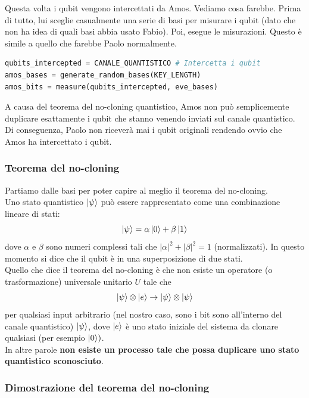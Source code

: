 \documentclass[a4paper]{article}
\begin{document}
Questa volta i qubit vengono intercettati da Amos. 
Vediamo cosa farebbe. Prima di tutto, lui sceglie casualmente una serie di basi
per misurare i qubit (dato che non ha idea di quali basi abbia usato Fabio).
Poi, esegue le misurazioni. Questo è simile a quello che farebbe Paolo normalmente.
\begin{lstlisting}[language=Python]
qubits_intercepted = CANALE_QUANTISTICO # Intercetta i qubit
amos_bases = generate_random_bases(KEY_LENGTH) 
amos_bits = measure(qubits_intercepted, eve_bases) 
\end{lstlisting}
A causa del teorema del no-cloning quantistico, Amos non può semplicemente duplicare esattamente 
i qubit che stanno venendo inviati sul canale quantistico. Di conseguenza, Paolo non riceverà mai 
i qubit originali rendendo ovvio che Amos ha intercettato i qubit.

\subsubsection{Teorema del no-cloning}

Partiamo dalle basi per poter capire al meglio il teorema del no-cloning.\\
Uno stato quantistico $\ket{\psi}$ può essere rappresentato come una combinazione lineare di stati:
\[
\ket{\psi} = \alpha \ket{0} + \beta \ket{1} \]
dove $\alpha$ e $\beta$ sono numeri complessi tali che $|\alpha|^2 + |\beta|^2 = 1$ (normalizzati).
In questo momento si dice che il qubit è in una superposizione di due stati.\\
Quello che dice il teorema del no-cloning è che non esiste un operatore (o trasformazione) universale unitario $U$ tale che
\[\ket{\psi} \otimes \ket{e} \rightarrow \ket{\psi} \otimes \ket{\psi}\]
per qualsiasi input arbitrario (nel nostro caso, sono i bit sono all'interno del canale quantistico) $\ket{\psi}$, dove $\ket{e}$ è uno stato iniziale del sistema da clonare qualsiasi (per esempio $\ket{0})$.\\
In altre parole \textbf{non esiste un processo tale che possa duplicare uno stato quantistico sconosciuto}.

\subsubsection*{Dimostrazione del teorema del no-cloning}
\end{document}
